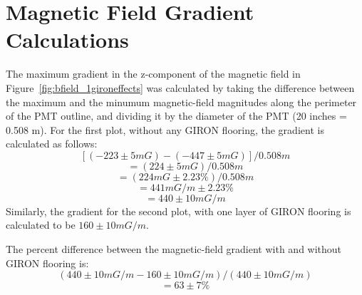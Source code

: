 
\appendix

\section{Magnetic Field Gradient Calculations}
\label{Appendix:MagneticFieldGradientCalculations}

The maximum gradient in the z-component of the magnetic field in Figure~\ref{fig:bfield_1gironeffects} was calculated by taking the difference between the maximum and the minumum magnetic-field magnitudes along the perimeter of the PMT outline, and dividing it by the diameter of the PMT (20 inches = 0.508 m).
For the first plot, without any GIRON flooring, the gradient is calculated as follows:
\[[(-223\pm5 mG) - (-447\pm5 mG)]/0.508 m\]
\[=(224\pm5 mG)/0.508 m\]
\[=(224 mG \pm 2.23\%)/0.508 m\]
\[=441 mG/m \pm 2.23\%\]
\[=440 \pm 10 mG/m \]
Similarly, the gradient for the second plot, with one layer of GIRON flooring is calculated to be $ 160 \pm 10 mG/m $.

The percent difference between the magnetic-field gradient with and without GIRON flooring is:
\[(440\pm10 mG/m - 160\pm10 mG/m)/(440\pm10 mG/m)\]
\[=63\pm7\%\]
